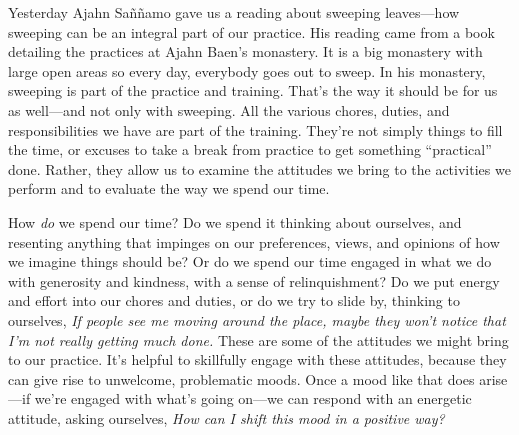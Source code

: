 
Yesterday Ajahn Saññamo gave us a reading about sweeping leaves---how 
sweeping can be an integral part of our practice. His reading came from 
a book detailing the practices at Ajahn Baen's monastery. It is a big 
monastery with large open areas so every day, everybody goes out to 
sweep. In his monastery, sweeping is part of the practice and training. 
That's the way it should be for us as well---and not only with 
sweeping. All the various chores, duties, and responsibilities we have 
are part of the training. They're not simply things to fill the time, 
or excuses to take a break from practice to get something ``practical'' 
done. Rather, they allow us to examine the attitudes we bring to the 
activities we perform and to evaluate the way we spend our time.

How \emph{do} we spend our time? Do we spend it thinking about 
ourselves, and resenting anything that impinges on our preferences, 
views, and opinions of how we imagine things should be? Or do we spend 
our time engaged in what we do with generosity and kindness, with a 
sense of relinquishment? Do we put energy and effort into our chores 
and duties, or do we try to slide by, thinking to ourselves, \emph{If 
people see me moving around the place, maybe they won't notice that I'm 
not really getting much done.} These are some of the attitudes we might 
bring to our practice. It's helpful to skillfully engage with these 
attitudes, because they can give rise to unwelcome, problematic moods. 
Once a mood like that does arise---if we're engaged with what's going 
on---we can respond with an energetic attitude, asking ourselves, 
\emph{How can I shift this mood in a positive way?}

